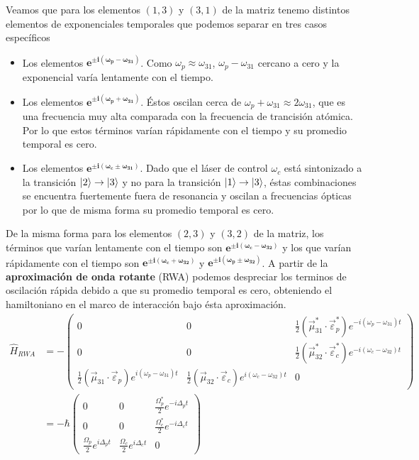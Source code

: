 Veamos que para los elementos $(1,3)$ y $(3,1)$ de la matriz tenemo distintos elementos de exponenciales temporales que podemos separar en tres casos específicos
\begin{itemize}
    \item Los elementos $\bm{e^{\pm  i(\omega_p-\omega_{31})}}$. Como $\omega_p \approx \omega_{31}$, $\omega_p-\omega_{31}$ cercano a cero y la exponencial varía lentamente con el tiempo.
    \item Los elementos $\bm{e^{\pm  i(\omega_p+\omega_{31})}}$. Éstos oscilan cerca de $\omega_p + \omega_{31} \approx 2\omega_{31}$, que es una frecuencia muy alta comparada con la frecuencia de trancisión atómica. Por lo que estos términos varían rápidamente con el tiempo y su promedio temporal es cero. 
    \item Los elementos $\bm{e^{\pm  i(\omega_c \pm \omega_{31})}}$. Dado que el láser de control $\omega_c$ está sintonizado a la transición $\ket{2} \to \ket{3}$ y no para la transición $\ket{1} \to  \ket{3}$, éstas combinaciones se encuentra fuertemente fuera de resonancia y oscilan a frecuencias ópticas por lo que de misma forma su promedio temporal es cero.
\end{itemize}
De la misma forma para los elementos $(2,3)$ y $(3,2)$ de la matriz, los términos que varían lentamente con el tiempo son $\bm{e^{\pm  i(\omega_c-\omega_{32})}}$ y los que varían rápidamente con el tiempo son $\bm{e^{\pm  i(\omega_c+\omega_{32})}}$ y $\bm{e^{\pm  i(\omega_p \pm \omega_{32})}}$. A partir de la \textbf{aproximación de onda rotante} (RWA) podemos despreciar los terminos de oscilación rápida debido a que su promedio temporal es cero, obteniendo el hamiltoniano en el marco de interacción bajo ésta aproximación.
\begin{equation}
\begin{split}
\hat{H}_{RWA} &= -\begin{pmatrix}
0 & 0 & \frac{1}{2}(\vec{\mu}_{31}^* \cdot \vec{\varepsilon}_{p}^*) e^{-i(\omega_p - \omega_{31})t} \\
0 & 0 & \frac{1}{2}(\vec{\mu}_{32}^* \cdot \vec{\varepsilon}_{c}^*) e^{-i(\omega_c - \omega_{32})t} \\
\frac{1}{2}(\vec{\mu}_{31} \cdot \vec{\varepsilon}_{p}) e^{i(\omega_p - \omega_{31})t} & \frac{1}{2}(\vec{\mu}_{32} \cdot \vec{\varepsilon}_{c}) e^{i(\omega_c - \omega_{32})t} & 0
\end{pmatrix}\\
&= - \hbar \begin{pmatrix}
0 & 0 & \frac{\Omega_p^*}{2} e^{-i \Delta_p t} \\
0 & 0 & \frac{\Omega_c^*}{2} e^{-i \Delta_c t} \\
\frac{\Omega_p}{2} e^{i \Delta_p t} & \frac{\Omega_c}{2} e^{i \Delta_c t} & 0
\end{pmatrix}
\end{split}
\end{equation}
